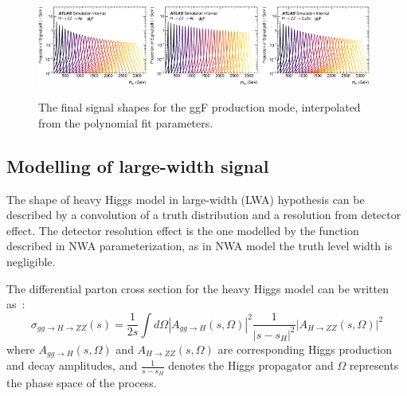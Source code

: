 \begin{figure}[htbp]
    \centering
    \includegraphics[width=0.32\textwidth]{figures/HMHZZ/signal/NWA//ggf_multipeakplot_4mu.eps}
    \includegraphics[width=0.32\textwidth]{figures/HMHZZ/signal/NWA//ggf_multipeakplot_4e.eps}
    \includegraphics[width=0.32\textwidth]{figures/HMHZZ/signal/NWA//ggf_multipeakplot_2mu2e.eps}
    \caption{The final signal shapes for the ggF production mode, interpolated from the polynomial fit parameters.}
    \label{fig:ggf_multipeak}
\end{figure}


\subsection{Modelling of large-width signal}
\label{sec:signal_lwa}

The \mfl shape of heavy Higgs model in large-width (LWA) hypothesis can be described by a convolution of a truth distribution and a resolution from detector effect.
The detector resolution effect is the one modelled by the function described in NWA parameterization, as in NWA model the truth level width is negligible.

The differential parton cross section for the heavy Higgs model can be written as~\cite{Goria:2011wa}:
\begin{equation}
    \sigma_{gg \to H \to ZZ} (s) = \frac{1}{2s}  \int d \Omega \left | A_{gg \to H}(s,\Omega) \right |^2 \frac{1}{ \left | s - s_H \right |^2}  \left | A_{H \to ZZ}(s,\Omega) \right |^2
\end{equation}
where $A_{gg \to H}(s,\Omega)$ and $A_{H \to ZZ}(s,\Omega)$ are corresponding Higgs production and decay amplitudes,
and $\frac{1}{s - s_H}$ denotes the Higgs propagator and $\Omega$ represents the phase space of the process.


